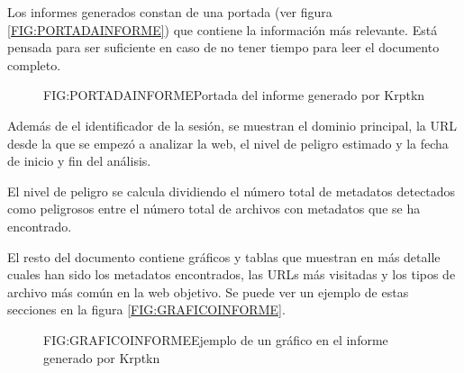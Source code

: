 Los informes generados constan de una portada (ver figura \ref{FIG:PORTADAINFORME}) que contiene la información más relevante. Está pensada para ser suficiente en caso de no tener tiempo para leer el documento completo.

\begin{figure}[portada]{FIG:PORTADAINFORME}{Portada del informe generado por Krptkn}
\end{figure}

Además de el identificador de la sesión, se muestran el dominio principal, la URL desde la que se empezó a analizar la web, el nivel de peligro estimado y la fecha de inicio y fin del análisis.

El nivel de peligro se calcula dividiendo el número total de metadatos detectados como peligrosos entre el número total de archivos con metadatos que se ha encontrado.

El resto del documento contiene gráficos y tablas que muestran en más detalle cuales han sido los metadatos encontrados, las URLs más visitadas y los tipos de archivo más común en la web objetivo. Se puede ver un ejemplo de estas secciones en la figura \ref{FIG:GRAFICOINFORME}.

\begin{figure}[graficoinforme]{FIG:GRAFICOINFORME}{Ejemplo de un gráfico en el informe generado por Krptkn}
\end{figure}
